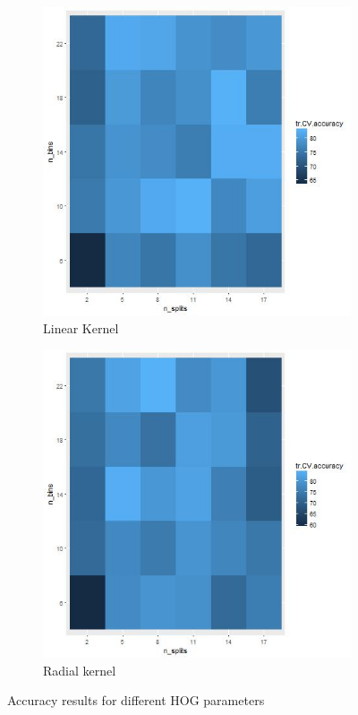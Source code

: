 \begin{figure}[H]
    \centering\begin{subfigure}[H]{0.49\linewidth}
    \includegraphics[width=\textwidth]{Images/Accuracy_for_categories_starfish_minaret.jpeg}
    \caption{Linear Kernel}
    \label{subfig:linear}
    \end{subfigure}
    \centering\begin{subfigure}[H]{0.49\linewidth}
    \includegraphics[width=\textwidth]{Images/Accuracy_for_categories_starfish_minaret_radial.jpeg}
    \caption{Radial kernel}
    \label{subfig:radial}
    \end{subfigure}
    \caption{Accuracy results for different HOG parameters}
    \label{fig:exp1}
\end{figure}

